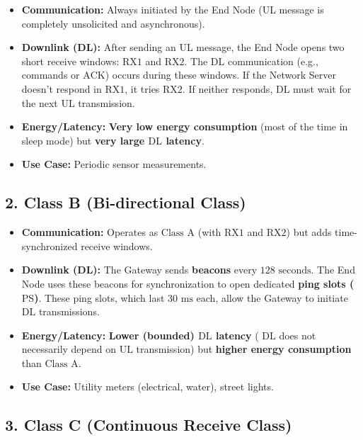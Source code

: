 \documentclass[a4paper, 12pt]{book} %
\begin{document}
\begin{itemize}
\tightlist
\item
  \textbf{Communication:} Always initiated by the End Node (UL message
  is completely unsolicited and asynchronous).
\item
  \textbf{Downlink (DL):} After sending an UL message, the End Node
  opens two short receive windows: \(\text{RX}1\) and \(\text{RX}2\).
  The \(\text{DL}\) communication (e.g., commands or \(\text{ACK}\))
  occurs during these windows. If the Network Server doesn't respond in
  \(\text{RX}1\), it tries \(\text{RX}2\). If neither responds,
  \(\text{DL}\) must wait for the next \(\text{UL}\) transmission.
\item
  \textbf{Energy/Latency:} \textbf{Very low energy consumption} (most of
  the time in sleep mode) but \textbf{very large \(\text{DL}\) latency}.
\item
  \textbf{Use Case:} Periodic sensor measurements.
\end{itemize}

\subsection{2. Class B (Bi-directional
Class)}\label{class-b-bi-directional-class}

\begin{itemize}
\tightlist
\item
  \textbf{Communication:} Operates as \(\text{Class A}\) (with
  \(\text{RX}1\) and \(\text{RX}2\)) but adds time-synchronized receive
  windows.
\item
  \textbf{Downlink (DL):} The Gateway sends \textbf{beacons} every
  \(128 \text{ seconds}\). The End Node uses these beacons for
  synchronization to open dedicated \textbf{ping slots (\(\text{PS}\))}.
  These ping slots, which last \(30 \text{ ms}\) each, allow the Gateway
  to initiate \(\text{DL}\) transmissions.
\item
  \textbf{Energy/Latency:} \textbf{Lower (bounded) \(\text{DL}\)
  latency} ( \(\text{DL}\) does not necessarily depend on \(\text{UL}\)
  transmission) but \textbf{higher energy consumption} than
  \(\text{Class A}\).
\item
  \textbf{Use Case:} Utility meters (electrical, water), street lights.
\end{itemize}

\subsection{3. Class C (Continuous Receive
Class)}\label{class-c-continuous-receive-class}
\end{document}
